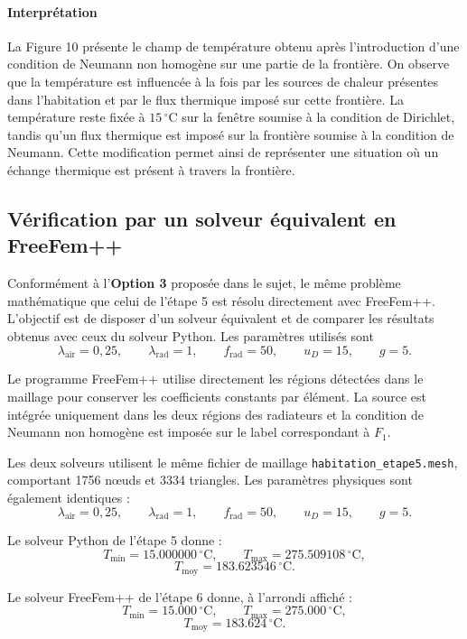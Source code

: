 \documentclass[12pt,a4paper]{article}
\begin{document}
	\paragraph{Interprétation}
	La Figure 10 présente le champ de température obtenu après l'introduction d'une condition de Neumann non homogène sur une partie de la frontière. On observe que la température est influencée à la fois par les sources de chaleur présentes dans l'habitation et par le flux thermique imposé sur cette frontière. La température reste fixée à $15\,^\circ\mathrm{C}$ sur la fenêtre soumise à la condition de Dirichlet, tandis qu'un flux thermique est imposé sur la frontière soumise à la condition de Neumann. Cette modification permet ainsi de représenter une situation où un échange thermique est présent à travers la frontière.
	
	\subsection{Vérification par un solveur équivalent en FreeFem++}
	
	Conformément à l'\textbf{Option 3} proposée dans le sujet, le même
	problème mathématique que celui de l'étape 5 est résolu directement avec
	FreeFem++. L'objectif est de disposer d'un solveur équivalent et de comparer
	les résultats obtenus avec ceux du solveur Python. Les paramètres utilisés
	sont
	\[
	\lambda_{\mathrm{air}}=0{,}25,\qquad
	\lambda_{\mathrm{rad}}=1,\qquad
	f_{\mathrm{rad}}=50,\qquad
	u_D=15,\qquad g=5.
	\]
	
	Le programme FreeFem++ utilise directement les régions détectées dans le
	maillage pour conserver les coefficients constants par élément. La source
	est intégrée uniquement dans les deux régions des radiateurs et la condition
	de Neumann non homogène est imposée sur le label correspondant à $F_1$.
	
	Les deux solveurs utilisent le même fichier de maillage
	\texttt{habitation\_etape5.mesh}, comportant 1756 nœuds et 3334 triangles.
	Les paramètres physiques sont également identiques :
	\[
	\lambda_{\mathrm{air}}=0{,}25,\qquad
	\lambda_{\mathrm{rad}}=1,\qquad
	f_{\mathrm{rad}}=50,\qquad
	u_D=15,\qquad g=5.
	\]
	
	Le solveur Python de l'étape 5 donne :
	\[
	T_{\min}=15.000000\,{}^\circ\mathrm{C},\qquad
	T_{\max}=275.509108\,{}^\circ\mathrm{C},
	\]
	\[
	T_{\mathrm{moy}}=183.623546\,{}^\circ\mathrm{C}.
	\]
	
	Le solveur FreeFem++ de l'étape 6 donne, à l'arrondi affiché :
	\[
	T_{\min}=15.000\,{}^\circ\mathrm{C},\qquad
	T_{\max}=275.000\,{}^\circ\mathrm{C},
	\]
	\[
	T_{\mathrm{moy}}=183.624\,{}^\circ\mathrm{C}.
	\]
	
\end{document}
